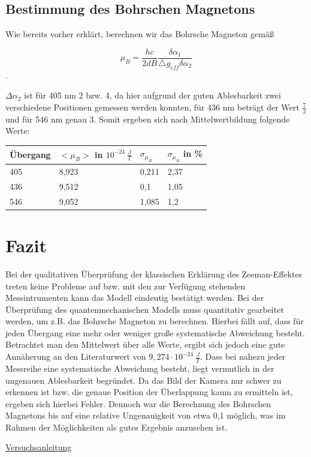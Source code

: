 \documentclass[bigchapter,colorback,accentcolor=tud4b,linedtoc,11pt]{tudreport}
\begin{document}
\section{Bestimmung des Bohrschen Magnetons}

Wie bereits vorher erklärt, berechnen wir das Bohrsche Magneton gemäß

$$\mu_{B}=\frac{hc}{2dB}\frac{\delta\alpha_{1}}{\triangle g_{eff}\delta\alpha_{2}}$$.

$\Delta \alpha_2$ ist für 405 nm 2 bzw. 4, da hier aufgrund der guten Ablesbarkeit zwei verschiedene Positionen gemessen werden konnten, für 436 nm beträgt der Wert $\frac{7}{2}$ und für 546 nm genau 3. Somit ergeben sich nach Mittelwertbildung folgende Werte:

\begin{center}
  \begin{tabular}{|p{2cm}|p{4cm}|p{2cm}|p{2cm}|}
    \hline
    Übergang & $< \mu_B >$ in $10^{-24}~ \frac{J}{T}$ & $\sigma_{\mu_B}$ & $\sigma_{\mu_B}$ in \% \\ \hline
    405               & 8,923 & 0,211 & 2,37  \\ \hline
    436               & 9,512 & 0,1 & 1,05  \\ \hline
    546               & 9,052 & 1,085 & 1,2  \\ \hline
    \end{tabular}
\end{center}

\chapter{Fazit}

Bei der qualitativen Überprüfung der klassischen Erklärung des Zeeman-Effektes treten keine Probleme auf bzw. mit den zur Verfügung stehenden Messintrumenten kann das Modell eindeutig bestätigt werden. Bei der Überprüfung des quantenmechanischen Modells muss quantitativ gearbeitet werden, um z.B. das Bohrsche Magneton zu berechnen. Hierbei fällt auf, dass für jeden Übergang eine mehr oder weniger große systematische Abweichung besteht. Betrachtet man den Mittelwert über alle Werte, ergibt sich jedoch eine gute Annäherung an den Literaturwert von $9,274 \cdot 10^{-24}~ \frac{J}{T}$. Dass bei nahezu jeder Messreihe eine systematische Abweichung besteht, liegt vermutlich in der ungenauen Ablesbarkeit begründet. Da das Bild der Kamera nur schwer zu erkennen ist bzw. die genaue Position der Überlappung kaum zu ermitteln ist, ergeben sich hierbei Fehler. Dennoch war die Berechnung des Bohrschen Magnetons bis auf eine relative Ungenauigkeit von etwa 0,1 möglich, was im Rahmen der Möglichkeiten als gutes Ergebnis anzusehen ist.

\cleardoublepage{}
\newpage
\begin{thebibliography}{100}
   \url{Versuchsanleitung}
\end{thebibliography}
\end{document}
